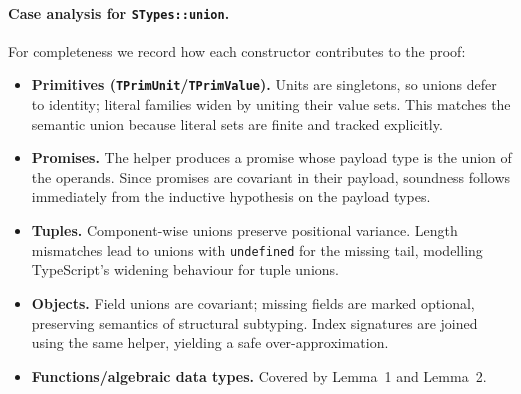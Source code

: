 \documentclass[11pt]{article}
\begin{document}
\paragraph{Case analysis for \texttt{STypes::union}.}
For completeness we record how each constructor contributes to the proof:
\begin{itemize}[leftmargin=*]
  \item \textbf{Primitives (\texttt{TPrimUnit}/\texttt{TPrimValue}).} Units are singletons, so unions defer to identity; literal families widen by uniting their value sets. This matches the semantic union because literal sets are finite and tracked explicitly.
  \item \textbf{Promises.} The helper produces a promise whose payload type is the union of the operands. Since promises are covariant in their payload, soundness follows immediately from the inductive hypothesis on the payload types.
  \item \textbf{Tuples.} Component-wise unions preserve positional variance. Length mismatches lead to unions with \texttt{undefined} for the missing tail, modelling TypeScript's widening behaviour for tuple unions.
  \item \textbf{Objects.} Field unions are covariant; missing fields are marked optional, preserving semantics of structural subtyping. Index signatures are joined using the same helper, yielding a safe over-approximation.
  \item \textbf{Functions/algebraic data types.} Covered by Lemma~1 and Lemma~2.
\end{itemize}
\end{document}
